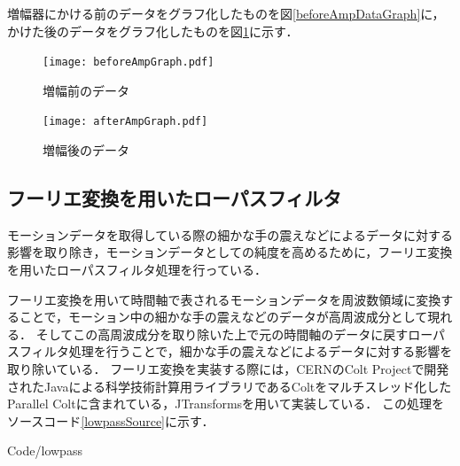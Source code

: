 \documentclass[12pt]{jreport}
\renewcommand{\slash}{/}
\begin{document}
        増幅器にかける前のデータをグラフ化したものを図\ref{beforeAmpDataGraph}に，かけた後のデータをグラフ化したものを図\ref{afterAmpDataGraph}に示す．

        \begin{figure}[btp]
            \begin{minipage}{0.5\hsize}
                \begin{center}
                    \texttt{[image: beforeAmpGraph.pdf]}
                \end{center}
                \caption{増幅前のデータ}
                \label{beforeAmpDataGraph}
            \end{minipage}
            \begin{minipage}{0.5\hsize}
                \begin{center}
                    \texttt{[image: afterAmpGraph.pdf]}
                \end{center}
                \caption{増幅後のデータ}
                \label{afterAmpDataGraph}
            \end{minipage}
        \end{figure}

        \subsection{フーリエ変換を用いたローパスフィルタ}
        モーションデータを取得している際の細かな手の震えなどによるデータに対する影響を取り除き，モーションデータとしての純度を高めるために，フーリエ変換を用いたローパスフィルタ処理を行っている．

        フーリエ変換を用いて時間軸で表されるモーションデータを周波数領域に変換することで，モーション中の細かな手の震えなどのデータが高周波成分として現れる．
        そしてこの高周波成分を取り除いた上で元の時間軸のデータに戻すローパスフィルタ処理を行うことで，細かな手の震えなどによるデータに対する影響を取り除いている．
        フーリエ変換を実装する際には，CERNのColt Project\cite{coltproj}で開発されたJavaによる科学技術計算用ライブラリであるColt\cite{colt}をマルチスレッド化したParallel Colt\cite{parallelcolt}に含まれている，JTransforms\cite{jtransforms}を用いて実装している．
        この処理をソースコード\ref{lowpassSource}に示す．

        
        {Code\slash lowpass}
\end{document}
